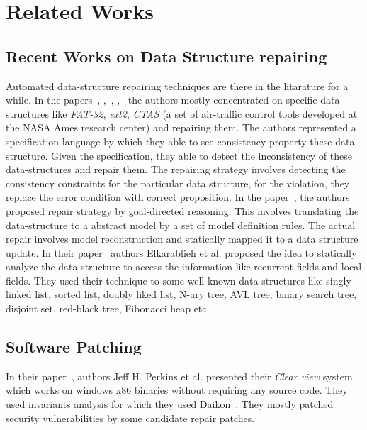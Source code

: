 

\chapter{Related Works}
\label{chapter:relatedWorks}

\section{Recent Works on Data Structure repairing}
\label{sec:RecWorksDataStructure}

Automated data-structure repairing techniques are there in the litarature for a
while. In the papers~\cite{DBLP:conf/oopsla/DemskyR03},
\cite{Demsky03automaticdata},~\cite{DBLP:conf/icse/DemskyR05},
\cite{DBLP:conf/issre/DemskyR03},~\cite{DBLP:conf/issta/DemskyEGMPR06} the
authors mostly concentrated on specific data-structures like \emph{FAT-32},
\emph{ext2}, \emph{CTAS} (a set of air-traffic control tools developed at the
NASA Ames research center) and repairing them. The authors represented a
specification language by which they able to see consistency property these
data-structure. Given the specification, they able to detect the inconsistency
of these data-structures and repair them.
The repairing strategy involves detecting the consistency constraints for the
particular data structure, for the violation, they replace the error condition
with correct proposition. In the paper~\cite{DBLP:conf/icse/DemskyR05}, the
authors proposed repair strategy by goal-directed reasoning. This involves
translating the data-structure to a abstract model by a set of model definition
rules. The actual repair involves model reconstruction and statically mapped it
to a data structure update. In their paper~\cite{DBLP:conf/oopsla/2007} authors
Elkarablieh et al. proposed the idea to statically analyze the data structure to
access the information like recurrent fields and local fields. They used their
technique to some well known data structures like singly linked list, sorted
list, doubly liked list, N-ary tree, AVL tree, binary search tree, disjoint set,
red-black tree, Fibonacci heap etc.

\section{Software Patching}
\label{sec:RecWorksSoftPatch}

In their paper~\cite{DBLP:conf/sosp/PerkinsKLABCPSSSWZER09}, authors Jeff H.
Perkins et al. presented their \emph{Clear view} system which works on windows
x86 binaries without requiring any source code. They used invariants analysis for
which they used Daikon~\cite{DBLP:journals/scp/ErnstPGMPTX07}. They mostly
patched security vulnerabilities by some candidate repair patches.

